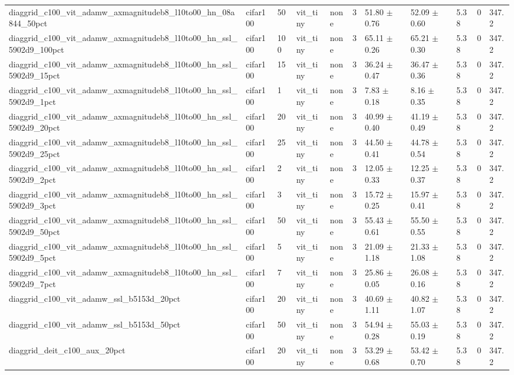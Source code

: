 \begin{tabular}{lllllllllll}
diaggrid_c100_vit_adamw_axmagnitudeb8_l10to00_hn_08a844_50pct & cifar100 & 50 & vit_tiny & none & 3 & 51.80 $\pm$ 0.76 & 52.09 $\pm$ 0.60 & 5.38 & 0 & 347.2 \\
diaggrid_c100_vit_adamw_axmagnitudeb8_l10to00_hn_ssl_5902d9_100pct & cifar100 & 100 & vit_tiny & none & 3 & 65.11 $\pm$ 0.26 & 65.21 $\pm$ 0.30 & 5.38 & 0 & 347.2 \\
diaggrid_c100_vit_adamw_axmagnitudeb8_l10to00_hn_ssl_5902d9_15pct & cifar100 & 15 & vit_tiny & none & 3 & 36.24 $\pm$ 0.47 & 36.47 $\pm$ 0.36 & 5.38 & 0 & 347.2 \\
diaggrid_c100_vit_adamw_axmagnitudeb8_l10to00_hn_ssl_5902d9_1pct & cifar100 & 1 & vit_tiny & none & 3 & 7.83 $\pm$ 0.18 & 8.16 $\pm$ 0.35 & 5.38 & 0 & 347.2 \\
diaggrid_c100_vit_adamw_axmagnitudeb8_l10to00_hn_ssl_5902d9_20pct & cifar100 & 20 & vit_tiny & none & 3 & 40.99 $\pm$ 0.40 & 41.19 $\pm$ 0.49 & 5.38 & 0 & 347.2 \\
diaggrid_c100_vit_adamw_axmagnitudeb8_l10to00_hn_ssl_5902d9_25pct & cifar100 & 25 & vit_tiny & none & 3 & 44.50 $\pm$ 0.41 & 44.78 $\pm$ 0.54 & 5.38 & 0 & 347.2 \\
diaggrid_c100_vit_adamw_axmagnitudeb8_l10to00_hn_ssl_5902d9_2pct & cifar100 & 2 & vit_tiny & none & 3 & 12.05 $\pm$ 0.33 & 12.25 $\pm$ 0.37 & 5.38 & 0 & 347.2 \\
diaggrid_c100_vit_adamw_axmagnitudeb8_l10to00_hn_ssl_5902d9_3pct & cifar100 & 3 & vit_tiny & none & 3 & 15.72 $\pm$ 0.25 & 15.97 $\pm$ 0.41 & 5.38 & 0 & 347.2 \\
diaggrid_c100_vit_adamw_axmagnitudeb8_l10to00_hn_ssl_5902d9_50pct & cifar100 & 50 & vit_tiny & none & 3 & 55.43 $\pm$ 0.61 & 55.50 $\pm$ 0.55 & 5.38 & 0 & 347.2 \\
diaggrid_c100_vit_adamw_axmagnitudeb8_l10to00_hn_ssl_5902d9_5pct & cifar100 & 5 & vit_tiny & none & 3 & 21.09 $\pm$ 1.18 & 21.33 $\pm$ 1.08 & 5.38 & 0 & 347.2 \\
diaggrid_c100_vit_adamw_axmagnitudeb8_l10to00_hn_ssl_5902d9_7pct & cifar100 & 7 & vit_tiny & none & 3 & 25.86 $\pm$ 0.05 & 26.08 $\pm$ 0.16 & 5.38 & 0 & 347.2 \\
diaggrid_c100_vit_adamw_ssl_b5153d_20pct & cifar100 & 20 & vit_tiny & none & 3 & 40.69 $\pm$ 1.11 & 40.82 $\pm$ 1.07 & 5.38 & 0 & 347.2 \\
diaggrid_c100_vit_adamw_ssl_b5153d_50pct & cifar100 & 50 & vit_tiny & none & 3 & 54.94 $\pm$ 0.28 & 55.03 $\pm$ 0.19 & 5.38 & 0 & 347.2 \\
diaggrid_deit_c100_aux_20pct & cifar100 & 20 & vit_tiny & none & 3 & 53.29 $\pm$ 0.68 & 53.42 $\pm$ 0.70 & 5.38 & 0 & 347.2 \\

\end{tabular}

